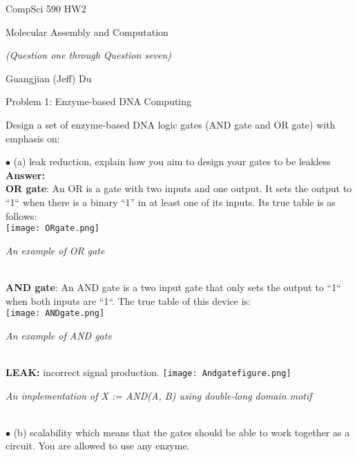 \documentclass{article}
\begin{document}
\centerline{\sc \large CompSci 590 HW2}
\vspace{1pc}
\centerline{\sc Molecular Assembly and Computation }
\vspace{1pc}

\centerline{\it (Question one through Question seven)}

\vspace{1pc}
\centerline{\sc  Guangjian (Jeff) Du}
\vspace{2pc}


\centerline{\sc Problem 1: Enzyme-based DNA Computing}
\vspace{0.2in}

Design a set of enzyme-based DNA logic gates (AND gate and OR gate) with emphasis on: 

$\bullet$ (a) leak reduction, explain how you aim to design your gates to be leakless \\
\textbf{Answer:} \\
\textbf{OR gate}:
An OR is a gate with two inputs and one output. It sets the output to “1“ when there is a
binary “1” in at least one of its inputs. Its true table is as follows:\\
  	\texttt{[image: ORgate.png]} \\
\centerline{\textit{An example of OR gate} }\\

\textbf{AND gate}:
An AND gate is a two input gate that only sets the output to “1“ when both inputs are “1“.
The true table of this device is: \\
  	\texttt{[image: ANDgate.png]} \\
\centerline{\textit{An example of AND gate} }\\
\textbf{LEAK:} incorrect signal production.
\newline
\texttt{[image: Andgatefigure.png]} \\
\centerline{\textit{An implementation of X := AND(A, B) using double-long domain motif}} \\





\vspace{0.1in}
$\bullet$ (b) scalability which means that the gates should be able to work together as a circuit. 
You are allowed to use any enzyme.\\
\end{document}
